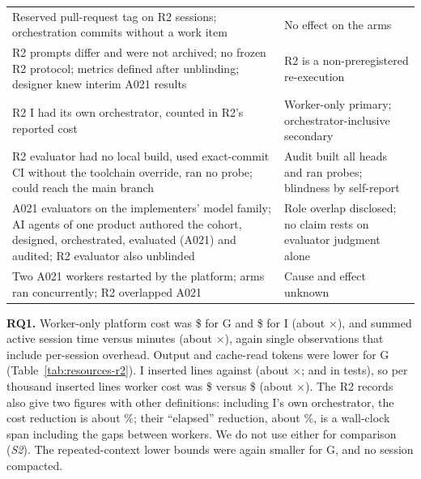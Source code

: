 \documentclass[10pt,conference]{IEEEtran}
\newcommand{\G}{G}
\newcommand{\I}{I}
\begin{document}
\begin{table}[t]
\begin{tabular}{@{}p{}p{}@{}}
Reserved pull-request tag on R2 sessions; orchestration commits without a work item & No effect on the arms \\
R2 prompts differ and were not archived; no frozen R2 protocol; metrics defined after unblinding; designer knew interim A021 results & R2 is a non-preregistered re-execution \\
R2 \I{} had its own orchestrator, counted in R2's reported cost & Worker-only primary; orchestrator-inclusive secondary \\
R2 evaluator had no local build, used exact-commit CI without the toolchain override, ran no probe; could reach the main branch & Audit built all heads and ran probes; blindness by self-report \\
A021 evaluators on the implementers' model family; AI agents of one product authored the cohort, designed, orchestrated, evaluated (A021) and audited; R2 evaluator also unblinded & Role overlap disclosed; no claim rests on evaluator judgment alone \\
Two A021 workers restarted by the platform; arms ran concurrently; R2 overlapped A021 & Cause and effect unknown \\
\hline
\end{tabular}
\end{table}

\textbf{RQ1.} Worker-only platform cost was \$\RtwoCostGrouped{} for \G{} and \$\RtwoCostIndep{} for \I{} (about \RtwoCostRatio$\times$), and summed active session time \RtwoActiveMinGrouped{} versus \RtwoActiveMinIndep{} minutes (about \RtwoActiveRatio$\times$), again single observations that include per-session overhead. %
Output and cache-read tokens were lower for \G{} (Table~\ref{tab:resources-r2}). %
\I{} inserted \RtwoInsLinesIndep{} lines against \RtwoInsLinesGrouped{} (about \RtwoInsLinesRatio$\times$; \RtwoInsTestLinesIndep{} and \RtwoInsTestLinesGrouped{} in tests), so per thousand inserted lines worker cost was \$\RtwoCostPerKLineIndep{} versus \$\RtwoCostPerKLineGrouped{} (about \RtwoCostPerLineRatio$\times$). %
The R2 records also give two figures with other definitions: including \I's own orchestrator, the cost reduction is about \RtwoCostInclOrchReduction\%; their ``elapsed'' reduction, about \RtwoElapsedReduction\%, is a wall-clock span including the gaps between workers. We do not use either for comparison (\emph{S2}). %
The repeated-context lower bounds were again smaller for \G{}, and no session compacted. %
\end{document}
